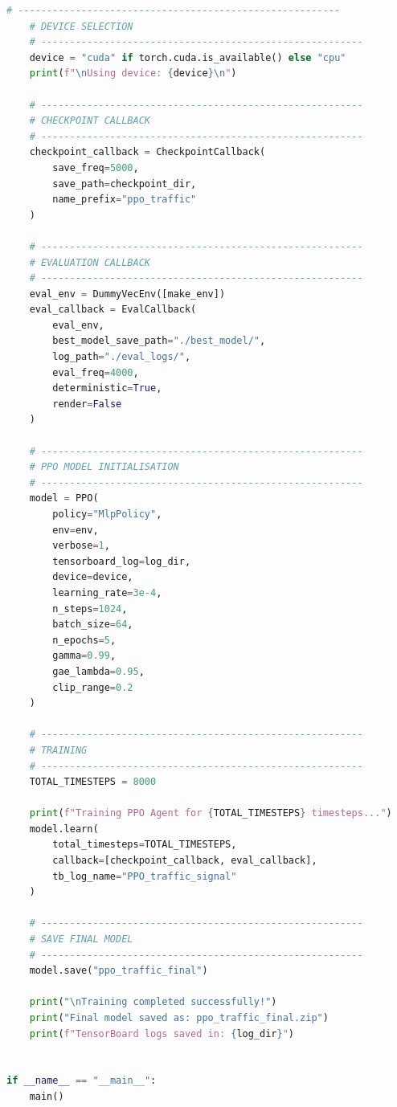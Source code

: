 ﻿\documentclass[11pt, a4paper]{report}
\begin{document}
\begin{lstlisting}[language=Python, caption={PPO Training Script, Tsotlhe N. Seiphepi (ID: 21001137)}]
    # --------------------------------------------------------
    # DEVICE SELECTION
    # --------------------------------------------------------
    device = "cuda" if torch.cuda.is_available() else "cpu"
    print(f"\nUsing device: {device}\n")

    # --------------------------------------------------------
    # CHECKPOINT CALLBACK
    # --------------------------------------------------------
    checkpoint_callback = CheckpointCallback(
        save_freq=5000,
        save_path=checkpoint_dir,
        name_prefix="ppo_traffic"
    )

    # --------------------------------------------------------
    # EVALUATION CALLBACK
    # --------------------------------------------------------
    eval_env = DummyVecEnv([make_env])
    eval_callback = EvalCallback(
        eval_env,
        best_model_save_path="./best_model/",
        log_path="./eval_logs/",
        eval_freq=4000,
        deterministic=True,
        render=False
    )

    # --------------------------------------------------------
    # PPO MODEL INITIALISATION
    # --------------------------------------------------------
    model = PPO(
        policy="MlpPolicy",
        env=env,
        verbose=1,
        tensorboard_log=log_dir,
        device=device,
        learning_rate=3e-4,
        n_steps=1024,
        batch_size=64,
        n_epochs=5,
        gamma=0.99,
        gae_lambda=0.95,
        clip_range=0.2
    )

    # --------------------------------------------------------
    # TRAINING
    # --------------------------------------------------------
    TOTAL_TIMESTEPS = 8000

    print(f"Training PPO Agent for {TOTAL_TIMESTEPS} timesteps...")
    model.learn(
        total_timesteps=TOTAL_TIMESTEPS,
        callback=[checkpoint_callback, eval_callback],
        tb_log_name="PPO_traffic_signal"
    )

    # --------------------------------------------------------
    # SAVE FINAL MODEL
    # --------------------------------------------------------
    model.save("ppo_traffic_final")

    print("\nTraining completed successfully!")
    print("Final model saved as: ppo_traffic_final.zip")
    print(f"TensorBoard logs saved in: {log_dir}")


if __name__ == "__main__":
    main()
\end{lstlisting}
\end{document}
